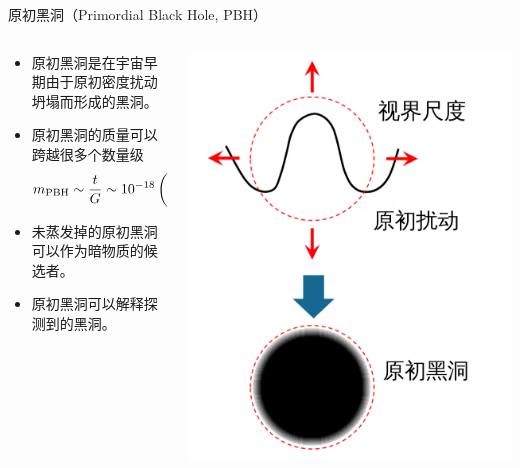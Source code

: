 \documentclass[xcolor={svgnames},compress]{beamer}
\let\olditem\item
\renewcommand{\item}{%
    \olditem\vspace{\fill}}
\def\e{\begin{equation}}
\def\q{\end{equation}}
\begin{document}
\begin{frame}{原初黑洞（Primordial Black Hole, PBH）}
    \vspace{-3mm}
    \begin{columns}
        \begin{column}{0.7\textwidth}
            \begin{itemize}
                \item 原初黑洞是在宇宙早期由于原初密度扰动坍塌而形成的黑洞。
                \item 原初黑洞的质量可以跨越很多个数量级
                \e 
                m_{\mathrm{PBH}} \sim \frac{t}{G} \sim 10^{-18} 
                \left(
                \frac{t}{10^{-23}}
                \right) \Msun
                \q
                \item 未蒸发掉的原初黑洞可以作为暗物质的候选者。
                \item 原初黑洞可以解释\lvc 探测到的黑洞。
            \end{itemize}
        \end{column}
        \begin{column}{0.4\textwidth} 
            \includegraphics[width=\textwidth]{pic/pbh_form} 
        \end{column}
    \end{columns}
    \vspace{2mm}
%             
\end{frame}
\end{document}
